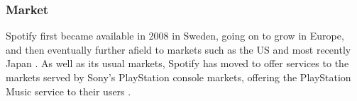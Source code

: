 \subsubsection{Market}
Spotify first became available in 2008 in Sweden, going on to grow in Europe, and then eventually further afield to markets such as the US and most recently Japan \parencite{spotify_story_so_far, spotify_japan_launch}. As well as its usual markets, Spotify has moved to offer services to the markets served by Sony's PlayStation console markets, offering the PlayStation Music service to their users \parencite{spotify_playstation_music_launch}.